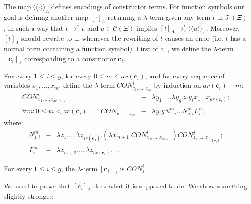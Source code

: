 \documentclass{LMCS}
\newcommand{\conone}{\mathbf{c}}
\newcommand{\varone}{x}
\newcommand{\vartwo}{y}
\newcommand{\varthree}{z}
\newcommand{\lambdatwo}{N}
\newcommand{\lambdathree}{L}
\newcommand{\termone}{t}
\newcommand{\termtwo}{u}
\newcommand{\TRSonetolambdaI}[1]{\langle\!\langle #1\rangle\!\rangle_{\Lambdaterms}}
\newcommand{\TRSonetolambdaII}[1]{[#1]_{\Lambdaterms}}
\newcommand{\errorterm}{\bot}
\newcommand{\arity}[1]{\mathit{ar}(#1)}
\newcommand{\Lambdaterms}{\Lambda}
\newcommand{\TRSone}{\Xi}
\newcommand{\TRStermsp}[1]{\mathcal{T}(#1)}
\newcommand{\TRScontermsp}[1]{\mathcal{C}(#1)}
\newcommand{\rewrTRS}{\rightarrow}
\newcommand{\rewrlambdav}{\rightarrow_v}
\newenvironment{varitemize}
{
\begin{list}{\labelitemi}
{\setlength{\itemsep}{0.0mm}
 \setlength{\topsep}{0.0mm}
 \setlength{\parindent}{0.0mm}
 \setlength{\parskip}{0.0mm}
 \setlength{\parsep}{0.0mm}
 \setlength{\partopsep}{0.0mm}
 \setlength{\leftmargin}{15pt}
 \setlength{\labelsep}{5pt}
 \setlength{\labelwidth}{10pt}}}
{
 \end{list} 
}
\begin{document}
\noindent The map $\TRSonetolambdaI{\cdot}$ defines encodings of constructor terms.
For function symbols our goal is defining another map $\TRSonetolambdaII{\cdot}$ returning
a $\lambda$-term given any term $t$ in $\TRStermsp{\TRSone}$, in such
a way that $\termone\rewrTRS^*\termtwo$ and $\termtwo\in\TRScontermsp{\TRSone}$ implies
$\TRSonetolambdaII{\termone}\rewrlambdav^*\TRSonetolambdaI{\termtwo}$. Moreover,
$\TRSonetolambdaII{\termone}$ should rewrite to $\errorterm$ whenever the rewriting of $\termone$
causes an error (i.e. $\termone$ has a normal form containing
a function symbol).
First of all, we define the $\lambda$-term $\TRSonetolambdaII{\conone_i}$ corresponding
to a constructor $\conone_i$.
\newcommand{\conslambda}{\mathit{CON}}
\newcommand{\patlambda}{\mathit{PAT}}
\begin{defi}\label{Def-TRSonetolambdaII}
  \begin{varitemize}
  \item
    For every $1\leq i\leq g$, for every $0\leq m\leq\arity{\conone_i}$, and for every
    sequence of variables $\varone_1,\ldots,\varone_m$, 
    define the $\lambda$-term $\conslambda^i_{\varone_1,\ldots,\varone_m}$ 
    by induction on $\arity{\conone_i}-m$:
    \begin{eqnarray*}
      \conslambda^i_{\varone_1,\ldots,\varone_{\arity{\conone_i}}}&\equiv&
      \lambda\vartwo_1.\ldots.\lambda\vartwo_{g}.\varthree.\vartwo_{i}\varone_1\ldots\varone_{\arity{\conone_i}};\\
      \forall m: 0\leq m<\arity{\conone_i} \qquad \conslambda^i_{\varone_1,\ldots,\varone_m}&\equiv&
      \lambda\vartwo.\vartwo\lambdatwo_{1,i}^m\ldots\lambdatwo_{g,i}^m\lambdathree^m_i;
    \end{eqnarray*}
    where:
    \begin{eqnarray*}
      \lambdatwo_{j,i}^m&\equiv&\lambda\varthree_1.\ldots.\lambda\varthree_{\arity{\conone_j}}.
      (\lambda\varone_{m+1}.\conslambda^i_{\varone_1,\ldots,\varone_{m+1}})
      \conslambda^{j}_{\varthree_1,\ldots,\varthree_{\arity{\conone_j}}};\\
      \lambdathree^m_i&\equiv&\lambda\varthree_{m+2}.\ldots.\lambda\varthree_{\arity{\conone_i}}.\errorterm.
    \end{eqnarray*}
  \item
    For every $1\leq i\leq g$, the $\lambda$-term $\TRSonetolambdaII{\conone_i}$ is $\conslambda^i_{\varepsilon}$.
  \end{varitemize}
\end{defi}
We need to prove that $\TRSonetolambdaII{\conone_i}$ does what it is supposed to do. We show something slightly stronger:
\end{document}
